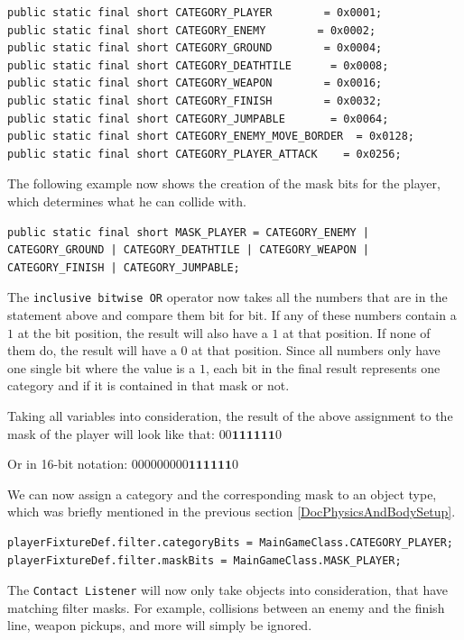 \documentclass[12p]{article}
\begin{document}
\begin{verbatim}
public static final short CATEGORY_PLAYER        = 0x0001;
public static final short CATEGORY_ENEMY        = 0x0002;
public static final short CATEGORY_GROUND        = 0x0004;
public static final short CATEGORY_DEATHTILE      = 0x0008;
public static final short CATEGORY_WEAPON        = 0x0016;
public static final short CATEGORY_FINISH        = 0x0032;
public static final short CATEGORY_JUMPABLE       = 0x0064;
public static final short CATEGORY_ENEMY_MOVE_BORDER  = 0x0128;
public static final short CATEGORY_PLAYER_ATTACK    = 0x0256;
\end{verbatim}

The following example now shows the creation of the mask bits for the player, which determines what he can collide with.

\begin{verbatim}
public static final short MASK_PLAYER = CATEGORY_ENEMY | CATEGORY_GROUND | CATEGORY_DEATHTILE | CATEGORY_WEAPON | CATEGORY_FINISH | CATEGORY_JUMPABLE;
\end{verbatim}

The \texttt{inclusive bitwise OR} operator now takes all the numbers that are in the statement above and compare them bit for bit. If any of these numbers contain a $1$ at the bit position, the result will also have a $1$ at that position. If none of them do, the result will have a $0$ at that position. Since all numbers only have one single bit where the value is a $1$, each bit in the final result represents one category and if it is contained in that mask or not.

Taking all variables into consideration, the result of the above assignment to the mask of the player will look like that: $00\mathbf{111111}0$

Or in 16-bit notation: $000000000\mathbf{111111}0$

We can now assign a category and the corresponding mask to an object type, which was briefly mentioned in the previous section \ref{DocPhysicsAndBodySetup}.

\begin{verbatim}
playerFixtureDef.filter.categoryBits = MainGameClass.CATEGORY_PLAYER;
playerFixtureDef.filter.maskBits = MainGameClass.MASK_PLAYER;
\end{verbatim}

The \texttt{Contact Listener} will now only take objects into consideration, that have matching filter masks. For example, collisions between an enemy and the finish line, weapon pickups, and more will simply be ignored.
\end{document}
